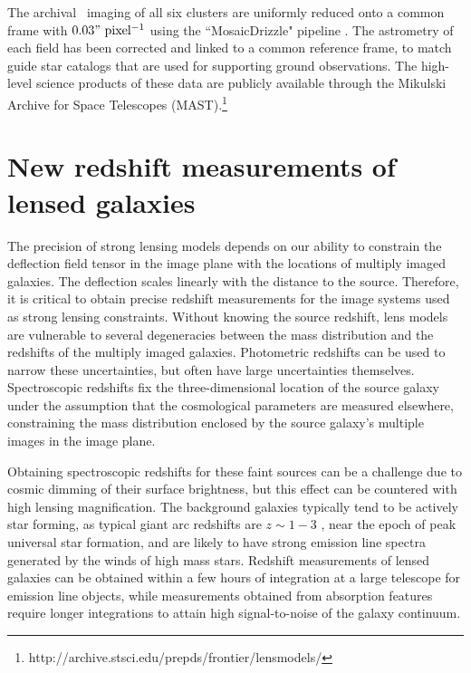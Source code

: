 The archival \hst\ imaging of all six clusters are uniformly reduced onto a common frame with $0.03"\ \mathrm{pixel^{-1}}$ using the ``MosaicDrizzle" pipeline \citep[Koekemoer et al 2002, ][for further details]{Koekemoer:2011fk}. The astrometry of each field has been corrected and linked to a common reference frame, to match guide star catalogs that are used for supporting ground observations. The high-level science products of these data are publicly available through the Mikulski Archive for Space Telescopes (MAST).\footnote{http://archive.stsci.edu/prepds/frontier/lensmodels/}

\section{New redshift measurements of lensed galaxies}
\label{chap2:sec:magellan}

The precision of strong lensing models depends on our ability to constrain the deflection field tensor in the image plane with the locations of multiply imaged galaxies. The deflection scales linearly with the distance to the source. Therefore, it is critical to obtain precise redshift measurements for the image systems used as strong lensing constraints. Without knowing the source redshift, lens models are vulnerable to several degeneracies between the mass distribution and the redshifts of the multiply imaged galaxies. Photometric redshifts can be used to narrow these uncertainties, but often have large uncertainties themselves. Spectroscopic redshifts fix the three-dimensional location of the source galaxy under the assumption that the cosmological parameters are measured elsewhere, constraining the mass distribution enclosed by the source galaxy's multiple images in the image plane.

Obtaining spectroscopic redshifts for these faint sources can be a challenge due to cosmic dimming of their surface brightness, but this effect can be countered with high lensing magnification. The background galaxies typically tend to be actively star forming, as  typical giant arc redshifts are $z\sim1-3$ \citep{Bayliss:2012rt,Bayliss:2011gf,Livermore:2012fk}, near the epoch of peak universal star formation, and are likely to have strong emission line spectra generated by the winds of high mass stars. Redshift measurements of lensed galaxies can be obtained within a few hours of integration at a large telescope for emission line objects, while measurements obtained from absorption features require longer integrations to attain high signal-to-noise of the galaxy continuum.

